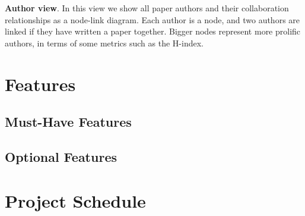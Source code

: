 \documentclass[dvips,12pt]{article}
\begin{document}
\textbf{Author view}. In this view we show all paper authors and their collaboration relationships as a node-link diagram. Each author is a node, and two authors are linked if they have written a paper together. Bigger nodes represent more prolific authors, in terms of some metrics such as the H-index.


\section{Features}
\subsection{Must-Have Features}
\subsection{Optional Features}

\section{Project Schedule}

\end{document}
